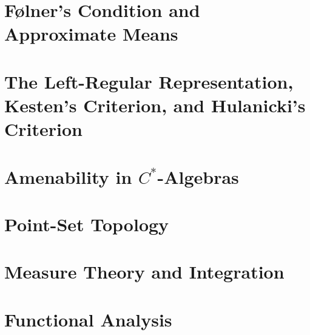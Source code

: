 \documentclass[10pt]{package2}
\begin{document}
\chapter{Følner's Condition and Approximate Means}\label{ch:folner_condition}

\chapter{The Left-Regular Representation, Kesten's Criterion, and Hulanicki's Criterion}\label{ch:left_regular_representation}
\chapter{Amenability in \texorpdfstring{$C^{\ast}$-Algebras}{C*-Algebras}}\label{ch:nuclearity}
\appendix
\chapter{Point-Set Topology}\label{ch:point_set_topology}

\chapter{Measure Theory and Integration}\label{ch:measure_theory}

\chapter{Functional Analysis}\label{ch:functional_analysis}

\nocite{*}
\printbibliography
\end{document}
